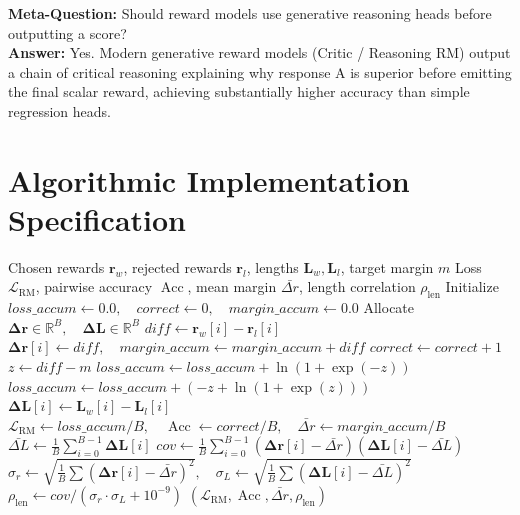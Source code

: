 \documentclass[11pt,a4paper]{article}
\theoremstyle{definition}
\begin{document}
\textbf{Meta-Question:} Should reward models use generative reasoning heads before outputting a score?\\
\textbf{Answer:} Yes. Modern generative reward models (Critic / Reasoning RM) output a chain of critical reasoning explaining why response A is superior before emitting the final scalar reward, achieving substantially higher accuracy than simple regression heads.

\section{Algorithmic Implementation Specification}

\begin{algorithm}[H]
\caption{Bradley-Terry Preference Loss and Telemetry Evaluation}
\begin{algorithmic}[1]
\Require Chosen rewards $\mathbf{r}_w$, rejected rewards $\mathbf{r}_l$, lengths $\mathbf{L}_w, \mathbf{L}_l$, target margin $m$
\Ensure Loss $\mathcal{L}_{\text{RM}}$, pairwise accuracy $\operatorname{Acc}$, mean margin $\bar{\Delta r}$, length correlation $\rho_{\text{len}}$
\State Initialize $loss\_accum \gets 0.0, \quad correct \gets 0, \quad margin\_accum \gets 0.0$
\State Allocate $\boldsymbol{\Delta r} \in \mathbb{R}^B, \quad \boldsymbol{\Delta L} \in \mathbb{R}^B$
    \State $diff \gets \mathbf{r}_w[i] - \mathbf{r}_l[i]$
    \State $\boldsymbol{\Delta r}[i] \gets diff, \quad margin\_accum \gets margin\_accum + diff$
        \State $correct \gets correct + 1$
    \EndIf
    \State $z \gets diff - m$
        \State $loss\_accum \gets loss\_accum + \ln(1 + \exp(-z))$
    \Else
        \State $loss\_accum \gets loss\_accum + (-z + \ln(1 + \exp(z)))$
    \EndIf
    \State $\boldsymbol{\Delta L}[i] \gets \mathbf{L}_w[i] - \mathbf{L}_l[i]$
\EndFor
\State $\mathcal{L}_{\text{RM}} \gets loss\_accum / B, \quad \operatorname{Acc} \gets correct / B, \quad \bar{\Delta r} \gets margin\_accum / B$
\State $\bar{\Delta L} \gets \frac{1}{B}\sum_{i=0}^{B-1} \boldsymbol{\Delta L}[i]$
\State $cov \gets \frac{1}{B}\sum_{i=0}^{B-1} (\boldsymbol{\Delta r}[i] - \bar{\Delta r})(\boldsymbol{\Delta L}[i] - \bar{\Delta L})$
\State $\sigma_r \gets \sqrt{\frac{1}{B}\sum (\boldsymbol{\Delta r}[i] - \bar{\Delta r})^2}, \quad \sigma_L \gets \sqrt{\frac{1}{B}\sum (\boldsymbol{\Delta L}[i] - \bar{\Delta L})^2}$
\State $\rho_{\text{len}} \gets cov / (\sigma_r \cdot \sigma_L + 10^{-9})$
\State \Return $(\mathcal{L}_{\text{RM}}, \operatorname{Acc}, \bar{\Delta r}, \rho_{\text{len}})$
\end{algorithmic}
\end{algorithm}
\end{document}
